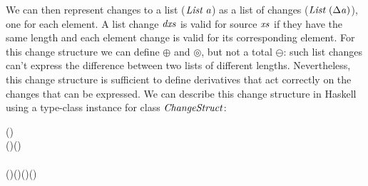 We can then represent changes to a list (\ensuremath{\Conid{List}\;\Varid{a}}) as a list of changes (\ensuremath{\Conid{List}\;(\Delta \Varid{a})}), one for each element.
A list change \ensuremath{\Varid{dxs}} is valid for source \ensuremath{\Varid{xs}} if
they have the same length and each element change is valid for
its corresponding element.
For this change structure we can define \ensuremath{\oplus } and
\ensuremath{\circledcirc }, but not a total \ensuremath{\ominus }: such list changes can't express the
difference between two lists of different lengths.
Nevertheless, this change structure is sufficient to define
derivatives that act correctly on the changes that can be expressed.
We can describe this change structure in Haskell using a
type-class instance for class \ensuremath{\Conid{ChangeStruct}}:
\begin{hscode}\SaveRestoreHook
{}%
%
%
\>[B]{}\;\;(\;)\;\<[E]%
\\
\>[B]{}\<[3]%
\>[3]{}\;\Delta (\;)\mathrel{=}\;(\Delta {}){}\<[E]%
\\
\>[B]{}\<[3]%
\>[3]{}\oplus {}\mathrel{=}\<[E]%
\\
\>[B]{}\<[3]%
\>[3]{}(\;\;)\oplus (\;\;)\mathrel{=}\;(\oplus {})\;(\oplus {}){}\<[E]%
\\
\>[B]{}\<[3]%
\>[3]{}\text{\textunderscore}\oplus \text{\textunderscore}\mathrel{=}\<[E]%
\ColumnHook
\end{hscode}\resethooks


